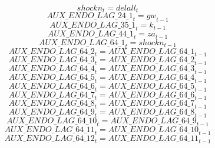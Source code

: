 \begin{dmath}
{shockn}_{t}={delall}_{t}
\end{dmath}
\begin{dmath}
{AUX\_ENDO\_LAG\_24\_1}_{t}={gw}_{t-1}
\end{dmath}
\begin{dmath}
{AUX\_ENDO\_LAG\_35\_1}_{t}={k}_{t-1}
\end{dmath}
\begin{dmath}
{AUX\_ENDO\_LAG\_44\_1}_{t}={za}_{t-1}
\end{dmath}
\begin{dmath}
{AUX\_ENDO\_LAG\_64\_1}_{t}={shockn}_{t-1}
\end{dmath}
\begin{dmath}
{AUX\_ENDO\_LAG\_64\_2}_{t}={AUX\_ENDO\_LAG\_64\_1}_{t-1}
\end{dmath}
\begin{dmath}
{AUX\_ENDO\_LAG\_64\_3}_{t}={AUX\_ENDO\_LAG\_64\_2}_{t-1}
\end{dmath}
\begin{dmath}
{AUX\_ENDO\_LAG\_64\_4}_{t}={AUX\_ENDO\_LAG\_64\_3}_{t-1}
\end{dmath}
\begin{dmath}
{AUX\_ENDO\_LAG\_64\_5}_{t}={AUX\_ENDO\_LAG\_64\_4}_{t-1}
\end{dmath}
\begin{dmath}
{AUX\_ENDO\_LAG\_64\_6}_{t}={AUX\_ENDO\_LAG\_64\_5}_{t-1}
\end{dmath}
\begin{dmath}
{AUX\_ENDO\_LAG\_64\_7}_{t}={AUX\_ENDO\_LAG\_64\_6}_{t-1}
\end{dmath}
\begin{dmath}
{AUX\_ENDO\_LAG\_64\_8}_{t}={AUX\_ENDO\_LAG\_64\_7}_{t-1}
\end{dmath}
\begin{dmath}
{AUX\_ENDO\_LAG\_64\_9}_{t}={AUX\_ENDO\_LAG\_64\_8}_{t-1}
\end{dmath}
\begin{dmath}
{AUX\_ENDO\_LAG\_64\_10}_{t}={AUX\_ENDO\_LAG\_64\_9}_{t-1}
\end{dmath}
\begin{dmath}
{AUX\_ENDO\_LAG\_64\_11}_{t}={AUX\_ENDO\_LAG\_64\_10}_{t-1}
\end{dmath}
\begin{dmath}
{AUX\_ENDO\_LAG\_64\_12}_{t}={AUX\_ENDO\_LAG\_64\_11}_{t-1}
\end{dmath}
